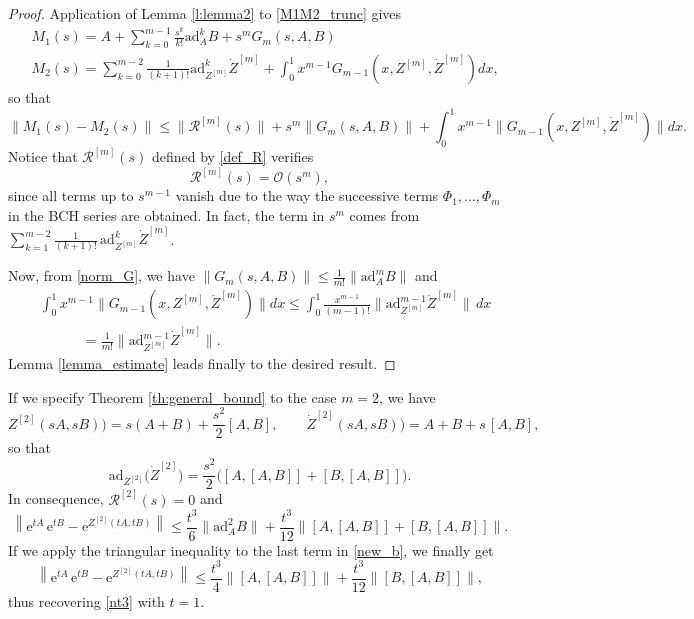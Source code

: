 \documentclass[11pt]{article}
\newcommand{\e}{\ensuremath{\mathrm{e}}}
\newcommand{\ad}{\ensuremath{\mathrm{ad}}}
\begin{document}
\begin{proof}
Application of Lemma \ref{l:lemma2} to \eqref{M1M2_trunc} gives
\[
 \begin{aligned}
  & M_1(s) = A + \sum_{k=0}^{m-1} \frac{s^k}{k!} \ad_A^k B + s^m G_m(s,A,B) \\
  & M_2(s) =  \sum_{k=0}^{m-2} \frac{1}{(k+1)!} \ad_{Z^{[m]}}^k \dot{Z}^{[m]} + \int_0^1 x^{m-1} G_{m-1}(x,Z^{[m]},  \dot{Z}^{[m]}) dx,
 \end{aligned}
\]
so that
\[
 \|M_1(s) - M_2(s)\| \le \|  \mathcal{R}^{[m]}(s) \| + s^m \|G_m(s,A,B)\| +  \int_0^1 x^{m-1} \| G_{m-1}(x,Z^{[m]},  \dot{Z}^{[m]})\| dx.
\]
Notice that $\mathcal{R}^{[m]}(s)$ defined by \eqref{def_R} verifies 
\[
   \mathcal{R}^{[m]}(s) = \mathcal{O}(s^m),
\]
since all terms up to $s^{m-1}$ vanish due to the way the successive terms $\Phi_1, \ldots, \Phi_m$ in the BCH series are obtained.  In fact, 
the term in $s^m$ comes from
$\sum_{k=1}^{m-2} \frac{1}{(k+1)!} \, \ad_{Z^{[m]}}^k \dot{Z}^{[m]}$. 


Now, from \eqref{norm_G}, we have
  $\|G_m(s,A,B)\| \le  \frac{1}{m!} \|\ad_A^m B\|$
and
\begin{equation} \label{norm_G2}
\begin{aligned}
   & \int_0^1 x^{m-1} \| G_{m-1}(x,Z^{[m]},  \dot{Z}^{[m]})\| dx   \le  \int_0^1 \frac{x^{m-1}}{(m-1)!} 
    \| \ad_{Z^{[m]}}^{m-1} \dot{Z}^{[m]} \| \, dx   \\
  & \qquad\quad = \frac{1}{m!} \| \ad_{Z^{[m]}}^{m-1} \dot{Z}^{[m]} \|.
\end{aligned}    
\end{equation}  
Lemma \ref{lemma_estimate} leads finally to the desired result. 
\end{proof}   

If we specify Theorem \ref{th:general_bound} to the case $m=2$, we have
\[
 Z^{[2]}(sA,sB)) = s(A+B) + \frac{s^2}{2} [A,B], \qquad \dot{Z}^{[2]}(sA,sB)) = A+ B + s \, [A, B],
\]
so that
\[
  \ad_{Z^{[2]}} \big( \dot{Z}^{[2]} \big) = \frac{s^2}{2} \big(  [A,[A,B]] + [B,[A,B]] \big).
\]
In consequence,  $\mathcal{R}^{[2]}(s) = 0$ and
\begin{equation} \label{new_b}
   \left\| \e^{t A} \, \e^{t B} - \e^{Z^{[2]}(tA, tB) } \right\|  \le \frac{t^3}{6} \|\ad_A^2 B\| +  \frac{t^3}{12} 
     \big\|[A,[A,B]] +  [B,[A,B]] \big\|. 
\end{equation}
If we apply the triangular inequality to the last term in \eqref{new_b}, we finally get 
\begin{equation} \label{new_b_2}
   \left\| \e^{t A} \, \e^{t B} - \e^{Z^{[2]}(tA, tB) } \right\|  \le \frac{t^3}{4} \|[A,[A,B]]\| + \frac{t^3}{12} \|[B,[A,B]]\|,
\end{equation}     
thus recovering \eqref{nt3} with $t=1$. 
\end{document}
